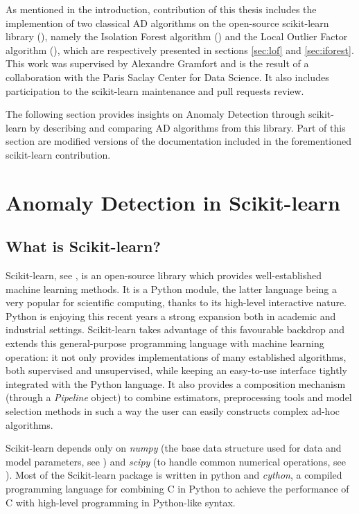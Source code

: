 As mentioned in the introduction, contribution of this thesis includes the implemention of two classical AD algorithms on the open-source scikit-learn library (\cite{sklearn2011}), namely the Isolation Forest algorithm (\cite{Liu2008}) and the Local Outlier Factor algorithm (\cite{Breunig2000LOF}), which are respectively presented in sections \ref{sec:lof} and \ref{sec:iforest}. This work was supervised by Alexandre Gramfort and is the result of a collaboration with the Paris Saclay Center for Data Science. It also includes participation to the scikit-learn maintenance and pull requests review.

The following section provides insights on Anomaly Detection through scikit-learn by describing and comparing AD algorithms from this library. Part of this section are modified versions of the documentation included in the forementioned scikit-learn contribution.

\section{Anomaly Detection in Scikit-learn}
\label{sec:AD_sklearn}

\subsection{What is Scikit-learn?}
Scikit-learn, see \cite{sklearn2011}, is an open-source library which provides well-established machine learning methods.
It is a Python module, the latter language being a very popular for scientific computing, thanks to its high-level interactive nature. Python is enjoying this recent years a strong expansion both in academic and industrial settings. Scikit-learn takes advantage of this favourable backdrop and extends this general-purpose programming language with machine learning operation: it not only provides implementations of many established algorithms, both supervised and unsupervised, while keeping an easy-to-use interface tightly integrated with the Python language. It also provides a composition mechanism (through a \emph{Pipeline} object) to combine estimators, preprocessing tools and model selection methods in such a way the user can easily constructs complex ad-hoc algorithms.

Scikit-learn depends only on \emph{numpy} (the base data structure used for data and model parameters, see \cite{Vanderwalt2011numpy}) and \emph{scipy} (to handle common numerical operations, see \cite{Jones2015scipy}).
Most of the Scikit-learn package is written in python and \emph{cython}, a compiled programming language for combining C in Python to achieve the performance of C with high-level programming in Python-like syntax.


